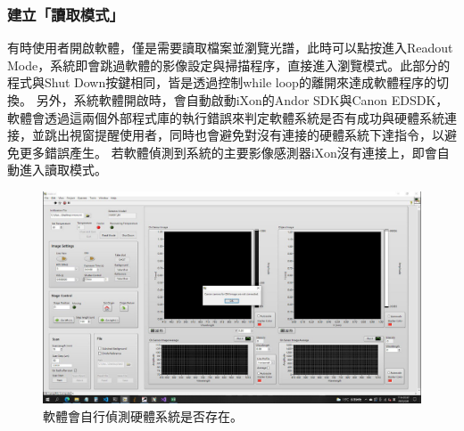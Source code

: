 \documentclass[12pt]{article}
\begin{document}
    \subsubsection{建立「讀取模式」}
    有時使用者開啟軟體，僅是需要讀取檔案並瀏覽光譜，此時可以點按進入Readout Mode，系統即會跳過軟體的影像設定與掃描程序，直接進入瀏覽模式。此部分的程式與Shut Down按鍵相同，皆是透過控制while loop的離開來達成軟體程序的切換。
    另外，系統軟體開啟時，會自動啟動iXon的Andor SDK與Canon EDSDK，軟體會透過這兩個外部程式庫的執行錯誤來判定軟體系統是否有成功與硬體系統連接，並跳出視窗提醒使用者，同時也會避免對沒有連接的硬體系統下達指令，以避免更多錯誤產生。
    若軟體偵測到系統的主要影像感測器iXon沒有連接上，即會自動進入讀取模式。
    \begin{figure}[ht]
        \centering
        \includegraphics[width=\linewidth]{detectHW.jpeg}
        \caption{軟體會自行偵測硬體系統是否存在。}
        \label{figure: detect hardware}
    \end{figure}
\end{document}
